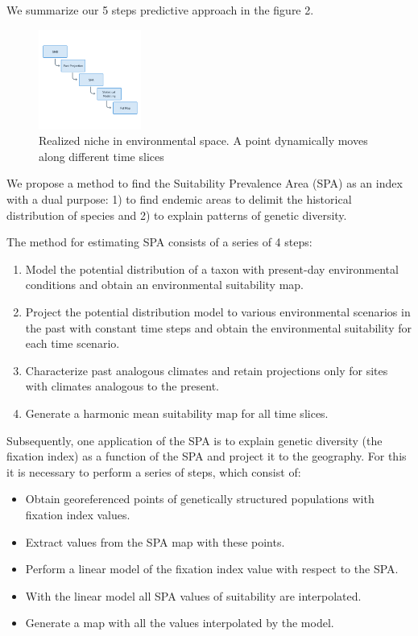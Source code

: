 \documentclass[
]{article}
\providecommand{\tightlist}{%
  \setlength{\itemsep}{0pt}\setlength{\parskip}{0pt}}
\begin{document}
We summarize our 5 steps predictive approach in the figure 2.

\begin{figure}
\centering
\includegraphics[width=0.3\textwidth,height=\textheight]{all_figures/figure_2.png}
\caption{Realized niche in environmental space. A point dynamically
moves along different time slices}
\end{figure}

We propose a method to find the Suitability Prevalence Area (SPA) as an
index with a dual purpose: 1) to find endemic areas to delimit the
historical distribution of species and 2) to explain patterns of genetic
diversity.

The method for estimating SPA consists of a series of 4 steps:

\begin{enumerate}
\def\labelenumi{\arabic{enumi}.}
\tightlist
\item
  Model the potential distribution of a taxon with present-day
  environmental conditions and obtain an environmental suitability map.
\item
  Project the potential distribution model to various environmental
  scenarios in the past with constant time steps and obtain the
  environmental suitability for each time scenario.
\item
  Characterize past analogous climates and retain projections only for
  sites with climates analogous to the present.
\item
  Generate a harmonic mean suitability map for all time slices.
\end{enumerate}

Subsequently, one application of the SPA is to explain genetic diversity
(the fixation index) as a function of the SPA and project it to the
geography. For this it is necessary to perform a series of steps, which
consist of:

\begin{itemize}
\tightlist
\item
  Obtain georeferenced points of genetically structured populations with
  fixation index values.
\item
  Extract values from the SPA map with these points.
\item
  Perform a linear model of the fixation index value with respect to the
  SPA.
\item
  With the linear model all SPA values of suitability are interpolated.
\item
  Generate a map with all the values interpolated by the model.
\end{itemize}
\end{document}
